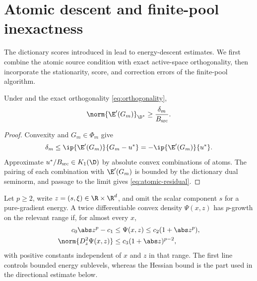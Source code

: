 \section{Atomic descent and finite-pool inexactness}
\label{sec:descent}

The dictionary scores introduced in  lead to energy-descent estimates. We first combine the atomic source condition with exact active-space orthogonality, then incorporate the stationarity, score, and correction errors of the finite-pool algorithm.

\begin{lemma}
\label{lem:atomic-residual}
Under  and the exact orthogonality \cref{eq:orthogonality},
\begin{equation}
  \norm{\E'(G_m)}_{\D^*}\geq \frac{\delta_m}{B_{\rm src}}.
\label{eq:atomic-residual}
\end{equation}
\end{lemma}

\begin{proof}
Convexity and \(G_m\in\Phi_m\) give
\[
 \delta_m\leq\ip{\E'(G_m)}{G_m-u^*}
 =-\ip{\E'(G_m)}{u^*}.
\]
Approximate \(u^*/B_{\rm src}\in K_1(\D)\) by absolute convex combinations of atoms. The pairing of each
combination with \(\E'(G_m)\) is bounded by the dictionary dual seminorm, and passage to the limit gives
\cref{eq:atomic-residual}.
\end{proof}

\begin{definition}
\label{def:p-growth}
Let \(p\geq2\), write \(z=(s,\xi)\in\R\times\R^d\), and omit the scalar component \(s\) for a
pure-gradient energy. A twice differentiable convex density \(\Psi(x,z)\) has \(p\)-growth on the
relevant range if, for almost every \(x\),
\begin{align*}
 c_0\abs z^p-c_1&\leq \Psi(x,z)\leq c_2(1+\abs z^p),\\
 \norm{D_z^2\Psi(x,z)}&\leq c_3(1+\abs z)^{p-2},
\end{align*}
with positive constants independent of \(x\) and \(z\) in that range. The first line controls bounded
energy sublevels, whereas the Hessian bound is the part used in the directional estimate below.
\end{definition}



